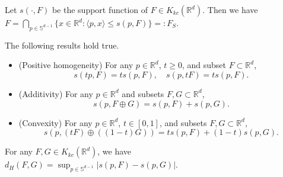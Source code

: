 \documentclass[10pt,a4paper]{amsart}
\begin{document}
\begin{lemma}\label{lem:cc-set-rep}
Let $s(\cdot, F)$ be the support function of $F\in K_{kc}(\mathbb{R}^d)$. Then we have $F = \bigcap_{p \in \mathbb{S}^{d-1}}\{x \in \mathbb{R}^d: \langle p, x \rangle \leq s(p, F)\}=: F_S$. 
\end{lemma}

\begin{lemma}\label{lem:sf-add-conv}
The following results hold true. 
\begin{itemize}
\item[(i)] (Positive homogeneity) For any $p \in \mathbb{R}^d$, $t \geq 0$, and subset $F \subset \mathbb{R}^d$,  
\[
s(tp, F) = ts(p,F),\quad s(p, t F) = ts(p,F). 
\] 
\item[(ii)] (Additivity) For any $p \in \mathbb{R}^d$ and subsets $F, G \subset \mathbb{R}^d$, 
\[
s(p, F \oplus G) = s(p, F) + s(p, G).
\] 
\item[(iii)] (Convexity) For any $p \in \mathbb{R}^d$, $t \in [0,1]$, and subsets $F, G \subset \mathbb{R}^d$,
\[
s(p, (t F) \oplus ((1-t) G)) = ts(p,F) + (1-t)s(p,G).
\] 
\end{itemize}
\end{lemma}

\begin{lemma}\label{lem:Hd-sf-conv}
For any $F,G \in K_{kc}(\mathbb{R}^d)$, we have $d_H(F, G) = \sup_{p \in \mathbb{S}^{d-1}}|s(p,F) - s(p,G)|$. 
\end{lemma}
\end{document}
